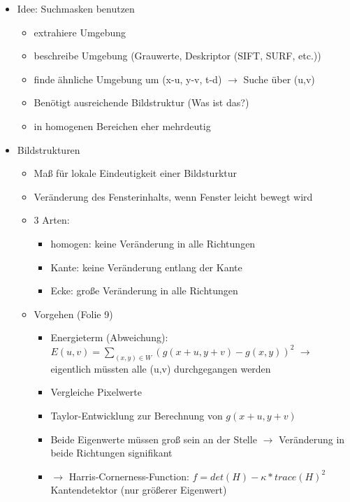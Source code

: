 \documentclass{report}
\begin{document}
\begin{itemize}
		\item Idee: Suchmasken benutzen
		\begin{itemize}
			\item extrahiere Umgebung
			\item beschreibe Umgebung (Grauwerte, Deskriptor (SIFT, SURF, etc.))
			\item finde ähnliche Umgebung um (x-u, y-v, t-d) $\rightarrow$ Suche über (u,v)
			\item Benötigt ausreichende Bildstruktur (Was ist das?)
			\item in homogenen Bereichen eher mehrdeutig
		\end{itemize}
	
		\item Bildstrukturen
		\begin{itemize}
			\item Maß für lokale Eindeutigkeit einer Bildsturktur
			\item Veränderung des Fensterinhalts, wenn Fenster leicht bewegt wird
			\item 3 Arten:
			\begin{itemize}
				\item homogen: keine Veränderung in alle Richtungen
				\item Kante: keine Veränderung entlang der Kante
				\item Ecke: große Veränderung in alle Richtungen
			\end{itemize}
		
			\item Vorgehen (Folie 9)
			\begin{itemize}
				\item Energieterm (Abweichung): $E(u,v) = \sum \limits_{(x,y) \in W} (g(x+u,y+v) - g(x,y))^2$
				\newline $\rightarrow$ eigentlich müssten alle (u,v) durchgegangen werden
				\item Vergleiche Pixelwerte
				\item Taylor-Entwicklung zur Berechnung von $g(x+u, y+v)$
				\item Beide Eigenwerte müssen groß sein an der Stelle $\rightarrow$ Veränderung in beide Richtungen signifikant
				\item $\rightarrow$ Harris-Cornerness-Function: $f = det(H) - \kappa * trace(H)^2$
				\newline Kantendetektor (nur größerer Eigenwert)
			\end{itemize}
		
		\end{itemize}
		

\end{itemize}
\end{document}
